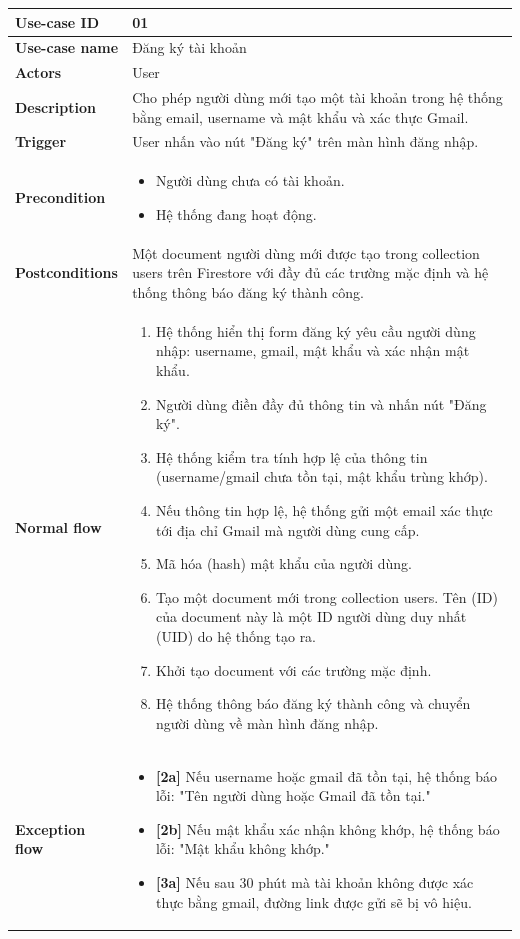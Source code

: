 \documentclass[a4paper, 12pt]{article}
\begin{document}
	\begin{longtable}{|p{3.5cm}|p{12cm}|}
		\hline
		\textbf{Use-case ID} & 01 \\
		\hline
		\textbf{Use-case name} & Đăng ký tài khoản \\
		\hline
		\textbf{Actors} & User \\
		\hline
		\textbf{Description} & Cho phép người dùng mới tạo một tài khoản trong hệ thống bằng email, username và mật khẩu và xác thực Gmail. \\
		\hline
		\textbf{Trigger} & User nhấn vào nút "Đăng ký" trên màn hình đăng nhập. \\
		\hline
		\textbf{Precondition} & 
		\begin{itemize}[label=+]
			\item Người dùng chưa có tài khoản.
			\item Hệ thống đang hoạt động.
		\end{itemize} \\
		\hline
		\textbf{Postconditions} & Một document người dùng mới được tạo trong collection users trên Firestore với đầy đủ các trường mặc định và hệ thống thông báo đăng ký thành công. \\
		\hline
		\textbf{Normal flow} & 
		\begin{enumerate}
			\item Hệ thống hiển thị form đăng ký yêu cầu người dùng nhập: username, gmail, mật khẩu và xác nhận mật khẩu.
			\item Người dùng điền đầy đủ thông tin và nhấn nút "Đăng ký".
			\item Hệ thống kiểm tra tính hợp lệ của thông tin (username/gmail chưa tồn tại, mật khẩu trùng khớp).
			\item Nếu thông tin hợp lệ, hệ thống gửi một email xác thực tới địa chỉ Gmail mà người dùng cung cấp.
			\item Mã hóa (hash) mật khẩu của người dùng.
			\item Tạo một document mới trong collection users. Tên (ID) của document này là một ID người dùng duy nhất (UID) do hệ thống tạo ra.
			\item Khởi tạo document với các trường mặc định.
			\item Hệ thống thông báo đăng ký thành công và chuyển người dùng về màn hình đăng nhập.
		\end{enumerate} \\
		\hline
		\textbf{Exception flow} & 
		\begin{itemize}[label={}]
			\item \textbf{[2a]} Nếu username hoặc gmail đã tồn tại, hệ thống báo lỗi: "Tên người dùng hoặc Gmail đã tồn tại."
			\item \textbf{[2b]} Nếu mật khẩu xác nhận không khớp, hệ thống báo lỗi: "Mật khẩu không khớp."
			\item \textbf{[3a]} Nếu sau 30 phút mà tài khoản không được xác thực bằng gmail, đường link được gửi sẽ bị vô hiệu.
		\end{itemize} \\
		\hline
	\end{longtable}
\end{document}
